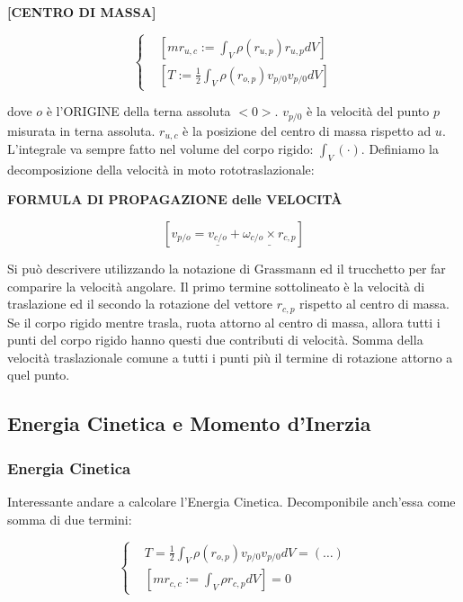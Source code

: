 \begin{defn}{\textbf{[CENTRO DI MASSA]}}

\[
	\left\{
	\begin{aligned}
	&[mr_{u,c} := \int_V{\rho(r_{u,p})r_{u,p}dV}]\\
	&[T := \frac{1}{2}\int_V{\rho(r_{o,p})v_{p/0}v_{p/0}dV}]
	\end{aligned}
	\right.
\]

\end{defn}

dove $o$ è l'ORIGINE della terna assoluta $<0>$. $v_{p/0}$ è la velocità del punto $p$ misurata in terna assoluta. $r_{u,c}$ è la posizione del centro di massa rispetto ad $u$. L'integrale va sempre fatto nel volume del corpo rigido: $\int_V{(\mathord{\cdot})}$. Definiamo la decomposizione della velocità in moto rototraslazionale:

\begin{thrm}{\textbf{FORMULA DI PROPAGAZIONE delle VELOCIT\`A}}

\[
	[v_{p/o} = \underline{v_{c/o}} + \underline{\omega_{c/o}\times r_{c,p}}]
\]

\end{thrm}

Si può descrivere utilizzando la notazione di Grassmann ed il trucchetto per far comparire la velocità angolare. Il primo termine sottolineato è la velocità di traslazione ed il secondo la rotazione del vettore $r_{c,p}$ rispetto al centro di massa. Se il corpo rigido mentre trasla, ruota attorno al centro di massa, allora tutti i punti del corpo rigido hanno questi due contributi di velocità. Somma della velocità traslazionale comune a tutti i punti più il termine di rotazione attorno a quel punto.

\subsection{Energia Cinetica e Momento d'Inerzia}

\subsubsection{Energia Cinetica}

Interessante andare a calcolare l'Energia Cinetica. Decomponibile anch'essa come somma di due termini:

\[
	\left\{
	\begin{aligned}
	&T = \frac{1}{2}\int_V{\rho(r_{o,p})v_{p/0}v_{p/0}dV} = (\dots)\\
	&[mr_{c,c} := \int_V{\rho r_{c,p}dV}] = 0
	\end{aligned}
	\right.
\]

